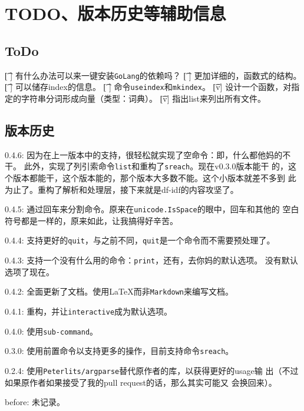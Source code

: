\section{TODO、版本历史等辅助信息}

\subsection{ToDo}
\begin{plttodoenv}{1}
    \t[ ] 有什么办法可以来一键安装\verb|GoLang|的依赖吗？
    \t[ ] 更加详细的，函数式的结构。
    \t[ ] 可以储存index的信息。
    \t[ ] 命令\verb|useindex|和\verb|mkindex|。
    \t[v] 设计一个函数，对指定的字符串分词形成向量（类型：词典）。
    \t[v] 指出list来列出所有文件。
\end{plttodoenv}
\bigskip

\subsection{版本历史}

\hline

0.4.6: 因为在上一版本中的支持，很轻松就实现了空命令：即，什么都他妈的不干。
此外，实现了列引索命令\verb|list|和重构了\verb|sreach|。现在v0.3.0版本能干
的，这个版本都能干，这个版本能的，那个版本大多数不能。这个小版本就差不多到
此为止了。重构了解析和处理层，接下来就是df-idf的内容攻坚了。

0.4.5: 通过回车来分割命令。原来在\verb|unicode.IsSpace|的眼中，回车和其他的
空白符号都是一样的，原来如此，让我搞得好辛苦。

0.4.4: 支持更好的\verb|quit|，与之前不同，\verb|quit|是一个命令而不需要预处理了。

0.4.3: 支持一个没有什么用的命令：\verb|print|，还有，去你妈的默认选项。
没有默认选项了现在。

0.4.2: 全面更新了文档。使用\LaTeX{}而非\verb|Markdown|来编写文档。

0.4.1: 重构，并让\verb|interactive|成为默认选项。

0.4.0: 使用\verb|sub-command|。

\hline

0.3.0: 使用前置命令以支持更多的操作，目前支持命令\verb|sreach|。

\hline

0.2.4: 使用\verb|Peterlits/argparse|替代原作者的库，以获得更好的usage输
出（不过如果原作者如果接受了我的pull request的话，那么其实可能又
会换回来）。

\hline

before: 未记录。

